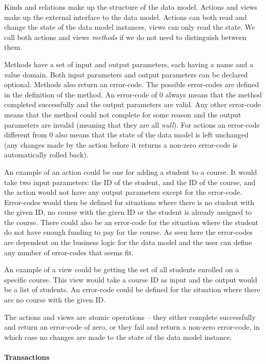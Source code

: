 Kinds and relations make up the structure of the data model. Actions
and views make up the external interface to the data model. Actions
can both read and change the state of the data model instances, views
can only read the state. We call both actions and views \emph{methods}
if we do not need to distinguish between them.

Methods have a set of input and output parameters, each having a name
and a value domain. Both input parameters and output parameters can
be declared optional. Methods also return an error-code. The possible
error-codes are defined in the definition of the method. An error-code
of 0 always means that the method completed successfully and the output
parameters are valid. Any other error-code means that the method could
not complete for some reason and the output parameters are invalid
(meaning that they are all \emph{null}). For actions an error-code
different from 0 also means that the state of the data model is left
unchanged (any changes made by the action before it returns a non-zero
error-code is automatically rolled back).

An example of an action could be one for adding a student to a course.
It would take two input parameters: the ID of the student, and the
ID of the course, and the action would not have any output parameters
except for the error-code. Error-codes would then be defined for situations
where there is no student with the given ID, no course with the given
ID or the student is already assigned to the course. There could also
be an error-code for the situation where the student do not have enough
funding to pay for the course. As seen here the error-codes are dependent
on the business logic for the data model and the user can define any
number of error-codes that seems fit.

An example of a view could be getting the set of all students enrolled
on a specific course. This view would take a course ID as input and
the output would be a list of students. An error-code could be defined
for the situation where there are no course with the given ID.

The actions and views are atomic operations -- they either complete
successfully and return an error-code of zero, or they fail and return
a non-zero error-code, in which case no changes are made to the state
of the data model instance.


\paragraph{\label{sub:Transactions}Transactions}


